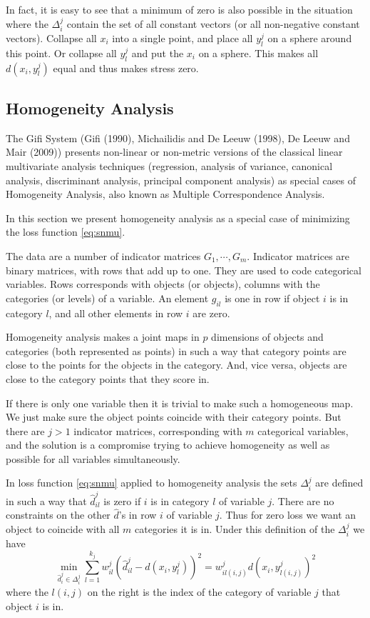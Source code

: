 \documentclass[
  12pt,
]{article}
\begin{document}
In fact, it is easy to see that a minimum of zero is also possible in the situation where the \(\Delta_i^j\) contain the
set of all constant vectors (or all non-negative constant vectors). Collapse all
\(x_i\) into a single point, and place all \(y_l^j\) on a sphere around this point.
Or collapse all \(y_l^j\) and put the \(x_i\) on a sphere. This makes all \(d(x_i,y_l^j)\)
equal and thus makes stress zero.

\subsection{Homogeneity Analysis}\label{homogeneity-analysis}

The Gifi System (Gifi (1990), Michailidis and De Leeuw (1998), De Leeuw and Mair (2009)) presents non-linear or non-metric versions of the classical linear multivariate analysis techniques (regression, analysis of variance, canonical analysis, discriminant analysis, principal component analysis) as special cases of Homogeneity Analysis, also known as Multiple Correspondence Analysis.

In this section we present homogeneity analysis as a special case of
minimizing the loss function \eqref{eq:snmu}.

The data are a number of indicator matrices \(G_1,\cdots,G_m\). Indicator matrices are binary matrices, with rows that add up to one. They are
used to code categorical variables. Rows corresponds with objects
(or objects), columns with the categories (or levels) of a variable.
An element \(g_{il}\) is one in row if object \(i\) is in category \(l\),
and all other elements in row \(i\) are zero.

Homogeneity analysis makes a joint maps in \(p\) dimensions of objects
and categories (both represented as points) in such a way that category points are close to the points for the objects in the category. And, vice versa, objects are close to the category points that they score in.

If there is only one variable then it is trivial to make such a
homogeneous map. We just make sure the object points coincide with
their category points. But there are \(j>1\) indicator matrices, corresponding with \(m\) categorical variables, and the solution is a compromise trying to achieve homogeneity as well as possible for all variables simultaneously.

In loss function \eqref{eq:snmu} applied to homogeneity analysis
the sets \(\Delta_i^j\) are defined in such a way that \(\hat d_{il}^j\) is zero if \(i\) is in category \(l\) of
variable \(j\). There are no constraints on the other \(\hat d\)'s in row \(i\)
of variable \(j\). Thus for zero loss we want an object to coincide with all \(m\) categories it is in. Under this definition of the \(\Delta_i^j\) we have
\begin{equation}
\min_{\hat d_i^j\in\Delta_i^j}\sum_{l=1}^{k_j}w_{il}^j(\hat d_{il}^j-d(x_i,y_l^j))^2=w_{il(i,j)}^jd(x_i,y_{l(i,j)}^j)^2
\label{eq:homsnmu}
\end{equation}
where the \(l(i,j)\) on the right is the index of the category of variable \(j\) that object \(i\) is in.
\end{document}
